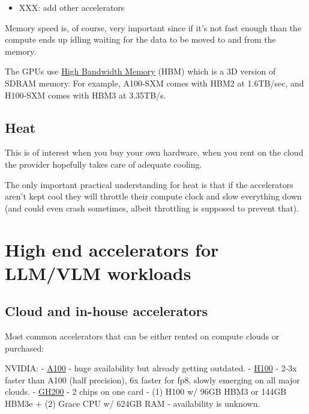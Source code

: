 \documentclass[
]{report}
\providecommand{\tightlist}{%
  \setlength{\itemsep}{0pt}\setlength{\parskip}{0pt}}\usepackage{longtable,booktabs,array}
\begin{document}
\begin{itemize}
\tightlist
\item
  XXX: add other accelerators
\end{itemize}

Memory speed is, of course, very important since if it's not fast enough
than the compute ends up idling waiting for the data to be moved to and
from the memory.

The GPUs use
\href{https://en.wikipedia.org/wiki/High_Bandwidth_Memory}{High
Bandwidth Memory} (HBM) which is a 3D version of SDRAM memory. For
example, A100-SXM comes with HBM2 at 1.6TB/sec, and H100-SXM comes with
HBM3 at 3.35TB/s.

\subsection{Heat}\label{heat}

This is of interest when you buy your own hardware, when you rent on the
cloud the provider hopefully takes care of adequate cooling.

The only important practical understanding for heat is that if the
accelerators aren't kept cool they will throttle their compute clock and
slow everything down (and could even crash sometimes, albeit throttling
is supposed to prevent that).

\section{High end accelerators for LLM/VLM
workloads}\label{high-end-accelerators-for-llmvlm-workloads}

\subsection{Cloud and in-house
accelerators}\label{cloud-and-in-house-accelerators}

Most common accelerators that can be either rented on compute clouds or
purchased:

NVIDIA: -
\href{https://www.nvidia.com/en-us/data-center/a100/\#specifications}{A100}
- huge availability but already getting outdated. -
\href{https://www.nvidia.com/en-us/data-center/h100}{H100} - 2-3x faster
than A100 (half precision), 6x faster for fp8, slowly emerging on all
major clouds. -
\href{https://www.nvidia.com/en-us/data-center/grace-hopper-superchip/}{GH200}
- 2 chips on one card - (1) H100 w/ 96GB HBM3 or 144GB HBM3e + (2) Grace
CPU w/ 624GB RAM - availability is unknown.
\end{document}
